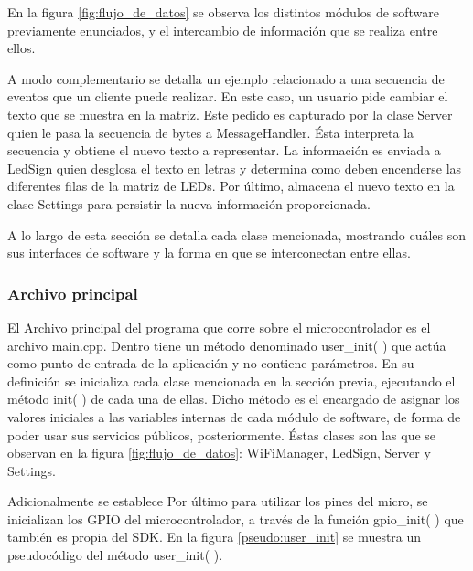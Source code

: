 En la figura \ref{fig:flujo_de_datos} se observa los distintos módulos de software previamente enunciados, y el intercambio de información que se realiza entre ellos.


A modo complementario se detalla un ejemplo relacionado a una secuencia de eventos que un cliente puede realizar.
En este caso, un usuario pide cambiar el texto que se muestra en la matriz. Este pedido es capturado por la clase Server quien le pasa la secuencia de bytes a MessageHandler.
Ésta interpreta la secuencia y obtiene el nuevo texto a representar. La información es enviada a LedSign quien desglosa el texto en letras y determina como deben encenderse las diferentes filas de la matriz de LEDs.
Por último, almacena el nuevo texto en la clase Settings para persistir la nueva información proporcionada.

A lo largo de esta sección se detalla cada clase mencionada, mostrando cuáles son sus interfaces de software y la forma en que se interconectan entre ellas.


\subsubsection{Archivo principal} \label{sec:archivo_principal}


El Archivo principal del programa que corre sobre el microcontrolador es el archivo main.cpp.
Dentro tiene un método denominado user\_init( ) que actúa como punto de entrada de la aplicación y no contiene parámetros.
En su definición se inicializa cada clase mencionada en la sección previa, ejecutando el método init( ) de cada una de ellas.
Dicho método es el encargado de asignar los valores iniciales a las variables internas de cada módulo de software, de forma de poder usar sus servicios públicos, posteriormente.
Éstas clases son las que se observan en la figura \ref{fig:flujo_de_datos}: WiFiManager, LedSign, Server y Settings.

Adicionalmente se establece %
Por último para utilizar los pines del micro, se inicializan los GPIO del microcontrolador, a través de la función gpio\_init( ) que también es propia del SDK.
En la figura \ref{pseudo:user_init} se muestra un pseudocódigo del método user\_init( ).


